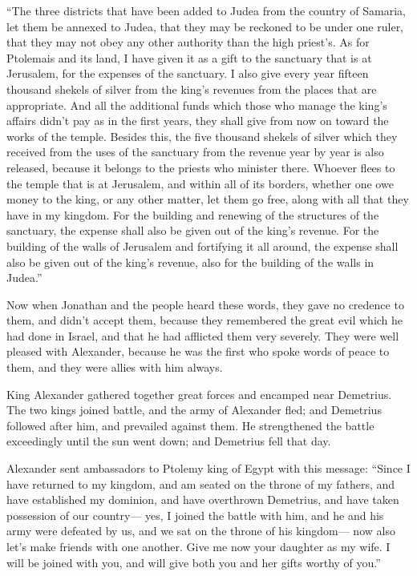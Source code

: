  ``The three districts that have been added to Judea from
the country of Samaria, let them be annexed to Judea, that they may be
reckoned to be under one ruler, that they may not obey any other
authority than the high priest's.  As for Ptolemais and
its land, I have given it as a gift to the sanctuary that is at
Jerusalem, for the expenses of the sanctuary.  I also
give every year fifteen thousand shekels of silver from the king's
revenues from the places that are appropriate.  And all
the additional funds which those who manage the king's affairs didn't
pay as in the first years, they shall give from now on toward the works
of the temple.  Besides this, the five thousand shekels
of silver which they received from the uses of the sanctuary from the
revenue year by year is also released, because it belongs to the priests
who minister there.  Whoever flees to the temple that is
at Jerusalem, and within all of its borders, whether one owe money to
the king, or any other matter, let them go free, along with all that
they have in my kingdom.  For the building and renewing
of the structures of the sanctuary, the expense shall also be given out
of the king's revenue.  For the building of the walls of
Jerusalem and fortifying it all around, the expense shall also be given
out of the king's revenue, also for the building of the walls in
Judea.''

 Now when Jonathan and the people heard these words, they
gave no credence to them, and didn't accept them, because they
remembered the great evil which he had done in Israel, and that he had
afflicted them very severely.  They were well pleased
with Alexander, because he was the first who spoke words of peace to
them, and they were allies with him always.

 King Alexander gathered together great forces and
encamped near Demetrius.  The two kings joined battle,
and the army of Alexander fled; and Demetrius followed after him, and
prevailed against them.  He strengthened the battle
exceedingly until the sun went down; and Demetrius fell that day.

 Alexander sent ambassadors to Ptolemy king of Egypt with
this message:  ``Since I have returned to my kingdom, and
am seated on the throne of my fathers, and have established my dominion,
and have overthrown Demetrius, and have taken possession of our
country---  yes, I joined the battle with him, and he and
his army were defeated by us, and we sat on the throne of his kingdom---
 now also let's make friends with one another. Give me
now your daughter as my wife. I will be joined with you, and will give
both you and her gifts worthy of you.''

